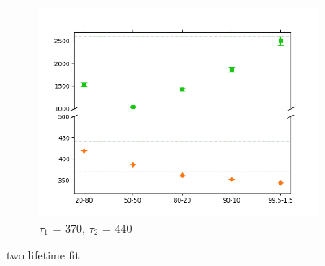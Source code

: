 \begin{figure}[p]
{        \begin{subfigure}{0.7\textwidth}
            \centering
            \includegraphics[width=0.95\linewidth]{Batch 7/348-440/output/2 life/lifetimes.png}
            \caption{$\tau_1$ = 370, $\tau_2$ = 440}
            \label{fig:2life_348}
        \end{subfigure}
    }
    \label{fig:2life}
    \caption{two lifetime fit} 
\end{figure}

